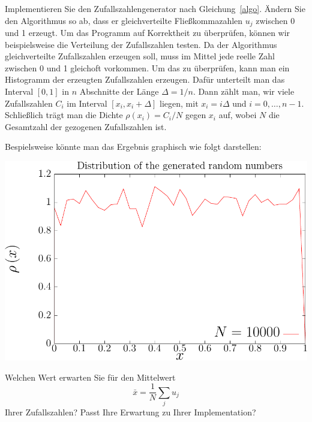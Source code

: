 \documentclass{article}[12pt]
\begin{document}
Implementieren Sie den Zufallszahlengenerator nach Gleichung~\ref{algo}. 
Ändern Sie den Algorithmus so ab, dass er gleichverteilte Fließkommazahlen $u_j$ zwischen 0 und 1 erzeugt.
Um das Programm auf Korrektheit zu überprüfen, können wir beispielsweise die Verteilung der Zufallszahlen testen.
Da der Algorithmus gleichverteilte Zufallszahlen erzeugen soll, muss im Mittel jede reelle Zahl zwischen 0 und 1 gleichoft vorkommen.
Um das zu überprüfen, kann man ein Histogramm der erzeugten Zufallszahlen erzeugen.
Dafür unterteilt man das Interval $[0,1]$ in $n$ Abschnitte der Länge $\Delta=1/n$. 
Dann zählt man, wir viele Zufallszahlen $C_i$ im Interval $[x_i,x_i+\Delta]$ liegen, mit $x_i=i\Delta$ und $i=0,\ldots,n-1$.
Schließlich trägt man die Dichte $\rho(x_i)=C_i/N$ gegen $x_i$ auf, wobei $N$ die Gesamtzahl der gezogenen Zufallszahlen ist. 

Bespielsweise könnte man das Ergebnis graphisch wie folgt darstellen:
\begin{center}
  \includegraphics[width=.8\linewidth]{dist1.pdf}
\end{center}
Welchen Wert erwarten Sie für den Mittelwert 
\[
\bar x = \frac{1}{N}\sum_j u_j
\]
Ihrer Zufallszahlen?
Passt Ihre Erwartung zu Ihrer Implementation?
\end{document}
